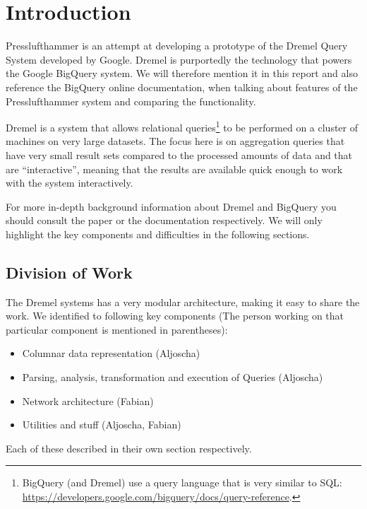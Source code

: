 
\section{Introduction}
Presslufthammer is an attempt at developing a prototype of the Dremel Query
System \cite{melnik2010dremel} developed by Google. Dremel is purportedly the
technology that powers the Google BigQuery \cite{bigquery} system. We will
therefore mention it in this report and also reference the BigQuery online
documentation, when talking about features of the Presslufthammer system
and comparing the functionality.

Dremel is a system that allows relational queries\footnote{BigQuery
(and Dremel) use a query language that is very similar to SQL: 
\url{https://developers.google.com/bigquery/docs/query-reference}.} to be
performed on a cluster of machines on very large datasets. The focus here
is on aggregation queries that have very small result sets compared to the
processed amounts of data and that are ``interactive'', meaning that the
results are available quick enough to work with the system interactively.

For more in-depth background information about Dremel and BigQuery you should
consult the paper or the documentation respectively. We will only highlight
the key components and difficulties in the following sections.

\subsection{Division of Work}

The Dremel systems has a very modular architecture, making it easy to share the
work. We identified to following key components (The person working on that
particular component is mentioned in parentheses):

\begin{itemize}
  \item Columnar data representation (Aljoscha)
  \item Parsing, analysis, transformation and execution of Queries (Aljoscha)
  \item Network architecture (Fabian)
  \item Utilities and stuff (Aljoscha, Fabian)
\end{itemize}

Each of these described in their own section respectively.


